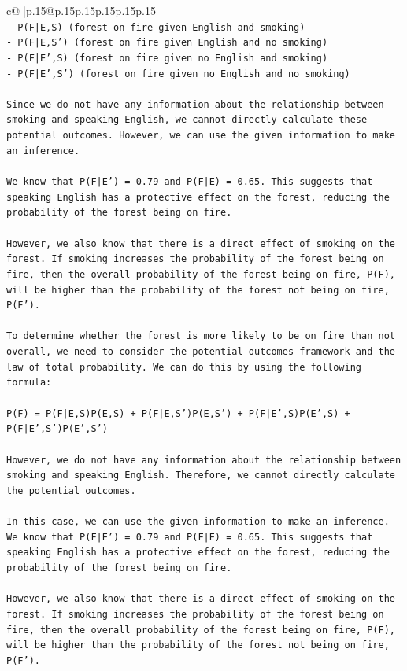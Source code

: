 \documentclass{article}
\begin{document}
{\begin{supertabular}{c@{$\;$}|p{.15\linewidth}@{}p{.15\linewidth}p{.15\linewidth}p{.15\linewidth}p{.15\linewidth}p{.15\linewidth}}
{{{\\ 
\texttt{{-} P(F|E,S) (forest on fire given English and smoking)} \\
\texttt{{-} P(F|E,S') (forest on fire given English and no smoking)} \\
\texttt{{-} P(F|E',S) (forest on fire given no English and smoking)} \\
\texttt{{-} P(F|E',S') (forest on fire given no English and no smoking)} \\
\\ 
\texttt{Since we do not have any information about the relationship between smoking and speaking English, we cannot directly calculate these potential outcomes. However, we can use the given information to make an inference.} \\
\\ 
\texttt{We know that P(F|E') = 0.79 and P(F|E) = 0.65. This suggests that speaking English has a protective effect on the forest, reducing the probability of the forest being on fire.} \\
\\ 
\texttt{However, we also know that there is a direct effect of smoking on the forest. If smoking increases the probability of the forest being on fire, then the overall probability of the forest being on fire, P(F), will be higher than the probability of the forest not being on fire, P(F').} \\
\\ 
\texttt{To determine whether the forest is more likely to be on fire than not overall, we need to consider the potential outcomes framework and the law of total probability. We can do this by using the following formula:} \\
\\ 
\texttt{P(F) = P(F|E,S)P(E,S) + P(F|E,S')P(E,S') + P(F|E',S)P(E',S) + P(F|E',S')P(E',S')} \\
\\ 
\texttt{However, we do not have any information about the relationship between smoking and speaking English. Therefore, we cannot directly calculate the potential outcomes.} \\
\\ 
\texttt{In this case, we can use the given information to make an inference. We know that P(F|E') = 0.79 and P(F|E) = 0.65. This suggests that speaking English has a protective effect on the forest, reducing the probability of the forest being on fire.} \\
\\ 
\texttt{However, we also know that there is a direct effect of smoking on the forest. If smoking increases the probability of the forest being on fire, then the overall probability of the forest being on fire, P(F), will be higher than the probability of the forest not being on fire, P(F').} \\
}}}
\end{supertabular}}
\end{document}
